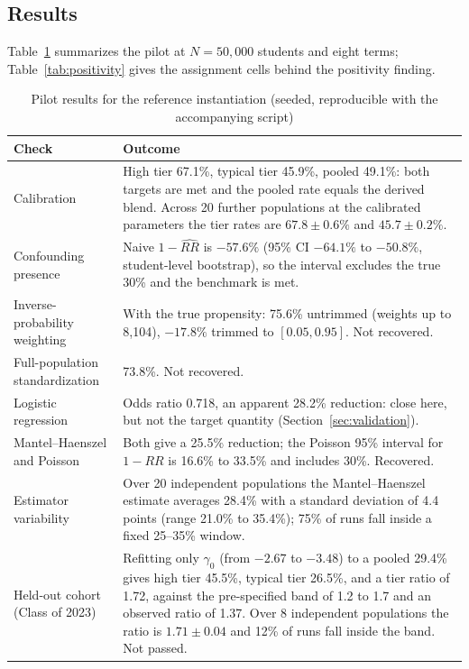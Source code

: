 \documentclass[11pt]{article}
\begin{document}
\subsection{Results}

Table~\ref{tab:pilot} summarizes the pilot at $N = 50{,}000$ students and eight terms; Table~\ref{tab:positivity} gives the assignment cells behind the positivity finding.

\begin{table}[ht]
\centering
\caption{Pilot results for the reference instantiation (seeded, reproducible with the accompanying script)}
\label{tab:pilot}
\small
\begin{tabular}{@{}p{}p{}@{}}
\toprule
\textbf{Check} & \textbf{Outcome} \\
\midrule
Calibration & High tier 67.1\%, typical tier 45.9\%, pooled 49.1\%: both targets are met and the pooled rate equals the derived blend. Across 20 further populations at the calibrated parameters the tier rates are $67.8 \pm 0.6\%$ and $45.7 \pm 0.2\%$. \\
\addlinespace
Confounding presence & Naive $1-\widehat{RR}$ is $-57.6\%$ (95\% CI $-64.1\%$ to $-50.8\%$, student-level bootstrap), so the interval excludes the true 30\% and the benchmark is met. \\
\addlinespace
Inverse-probability weighting & With the true propensity: 75.6\% untrimmed (weights up to 8,104), $-17.8\%$ trimmed to $[0.05, 0.95]$. Not recovered. \\
\addlinespace
Full-population standardization & 73.8\%. Not recovered. \\
\addlinespace
Logistic regression & Odds ratio 0.718, an apparent 28.2\% reduction: close here, but not the target quantity (Section~\ref{sec:validation}). \\
\addlinespace
Mantel--Haenszel and Poisson & Both give a 25.5\% reduction; the Poisson 95\% interval for $1-RR$ is 16.6\% to 33.5\% and includes 30\%. Recovered. \\
\addlinespace
Estimator variability & Over 20 independent populations the Mantel--Haenszel estimate averages 28.4\% with a standard deviation of 4.4 points (range 21.0\% to 35.4\%); 75\% of runs fall inside a fixed 25--35\% window. \\
\addlinespace
Held-out cohort (Class of 2023) & Refitting only $\gamma_0$ (from $-2.67$ to $-3.48$) to a pooled 29.4\% gives high tier 45.5\%, typical tier 26.5\%, and a tier ratio of 1.72, against the pre-specified band of 1.2 to 1.7 and an observed ratio of 1.37. Over 8 independent populations the ratio is $1.71 \pm 0.04$ and 12\% of runs fall inside the band. Not passed. \\
\bottomrule
\end{tabular}
\end{table}
\end{document}
